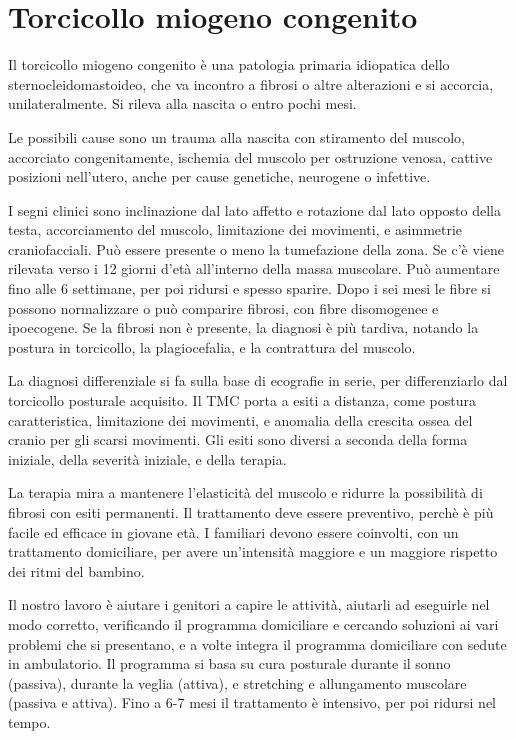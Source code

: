 \chapter{Torcicollo miogeno congenito}
Il torcicollo miogeno congenito è una patologia primaria idiopatica dello sternocleidomastoideo, che va incontro a fibrosi o altre
alterazioni e si accorcia, unilateralmente. Si rileva alla nascita o entro pochi mesi.

Le possibili cause sono un trauma alla nascita con stiramento del muscolo, accorciato congenitamente, ischemia del muscolo per
ostruzione venosa, cattive posizioni nell'utero, anche per cause genetiche, neurogene o infettive.

I segni clinici sono inclinazione dal lato affetto e rotazione dal lato opposto della testa, accorciamento del muscolo, limitazione dei
movimenti, e asimmetrie craniofacciali.
Può essere presente o meno la tumefazione della zona. Se c'è viene rilevata verso i 12 giorni d'età all'interno della massa muscolare.
Può aumentare fino alle 6 settimane, per poi ridursi e spesso sparire. Dopo i sei mesi le fibre si possono normalizzare o può comparire
fibrosi, con fibre disomogenee e ipoecogene.
Se la fibrosi non è presente, la diagnosi è più tardiva, notando la postura in torcicollo, la plagiocefalia, e la contrattura del
muscolo.

La diagnosi differenziale si fa sulla base di ecografie in serie, per differenziarlo dal torcicollo posturale acquisito.
Il TMC porta a esiti a distanza, come postura caratteristica, limitazione dei movimenti, e anomalia della crescita ossea del cranio per
gli scarsi movimenti.
Gli esiti sono diversi a seconda della forma iniziale, della severità iniziale, e della terapia.

La terapia mira a mantenere l'elasticità del muscolo e ridurre la possibilità di fibrosi con esiti permanenti. Il trattamento deve
essere preventivo, perchè è più facile ed efficace in giovane età. I familiari devono essere coinvolti, con un trattamento domiciliare, 
per avere un'intensità maggiore e un maggiore rispetto dei ritmi del bambino.


Il nostro lavoro è aiutare i genitori a capire le attività, aiutarli ad eseguirle nel modo corretto, verificando il programma
domiciliare e cercando soluzioni ai vari problemi che si presentano, e a volte integra il programma domiciliare con sedute in
ambulatorio.
Il programma si basa su cura posturale durante il sonno (passiva), durante la veglia (attiva), e stretching e allungamento muscolare
(passiva e attiva). Fino a 6-7 mesi il trattamento è intensivo, per poi ridursi nel tempo.

